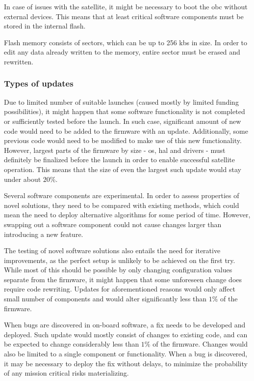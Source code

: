 In case of issues with the satellite, it might be necessary to boot the \gls{obc} without external devices. This means that at least critical software components must be stored in the internal flash.

Flash memory consists of sectors, which can be up to 256 \glspl{kb} in size. In order to edit any data already written to the memory, entire sector must be erased and rewritten. \cite{STMicroelectronics2018}

\subsubsection{Types of updates}

Due to limited number of suitable launches (caused mostly by limited funding possibilities), it might happen that some software functionality is not completed or sufficiently tested before the launch. In such case, significant amount of new code would need to be added to the firmware with an update. Additionally, some previous code would need to be modified to make use of this new functionality. However, largest parts of the firmware by size - \gls{os}, \gls{hal} and drivers - must definitely be finalized before the launch in order to enable successful satellite operation. This means that the size of even the largest such update would stay under about $20\%$.

Several software components are experimental. In order to assess properties of novel solutions, they need to be compared with existing methods, which could mean the need to deploy alternative algorithms for some period of time. However, swapping out a software component could not cause changes larger than introducing a new feature.

The testing of novel software solutions also entails the need for iterative improvements, as the perfect setup is unlikely to be achieved on the first try. While most of this should be possible by only changing configuration values separate from the firmware, it might happen that some unforeseen change does require code rewriting. Updates for aforementioned reasons would only affect small number of components and would alter significantly less than $1\%$ of the firmware.

When bugs are discovered in on-board software, a fix needs to be developed and deployed. Such update would mostly consist of changes to existing code, and can be expected to change considerably less than $1\%$ of the firmware. Changes would also be limited to a single component or functionality. When a bug is discovered, it may be necessary to deploy the fix without delays, to minimize the probability of any mission critical risks materializing.

